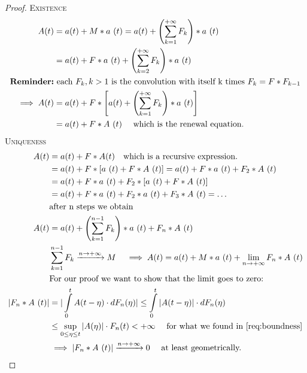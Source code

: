 \begin{proof}
	\proofpart
	\textsc{Existence}
		\begin{equation}\begin{split}
			A(t) &= a(t) + M \ast a~(t) = a(t) + \left(\sum\limits_{k=1}^{+\infty} F_k \right) \ast a~(t) \\
			&= a(t) + F \ast a~(t) +\left(\sum\limits_{k=2}^{+\infty} F_k \right) \ast a~(t)\\
			\text{\textbf{Reminder:}}&\text{ each $F_k , k>1$ is the convolution with itself k times $F_k = F \ast F_{k-1}$} \\
			\implies A(t) &= a(t) + F \ast \left[ a(t) + \left(\sum\limits_{k=1}^{+\infty} F_k \right) \ast a~(t) \right] \\
			&=a(t) + F \ast A ~ (t) \quad \text{ which is the renewal equation.}
		\end{split}\end{equation}
	\proofpart
	\textsc{Uniqueness}
	\begin{equation}\begin{split}
		A(t) &= a(t) + F \ast A(t) \quad \text{which is a recursive expression.} \\
		&= a(t) + F \ast \left[a~(t) + F \ast A~(t) \right] = a(t) + F \ast a ~ (t) + F_2 \ast A~(t) \\
		&= a(t) + F \ast a ~ (t) + F_2 \ast \left[a~(t) + F \ast A~(t) \right] \\
		&= a(t) + F \ast a~(t) + F_2 \ast a~(t) + F_3 \ast A~(t) = \dots \\
		&\text{after n steps we obtain} \\
		A(t) &= a(t) + \left( \sum\limits_{k=1}^{n-1}F_k\right) \ast a~(t) + F_n \ast A~(t) \\
		& \sum\limits_{k=1}^{n-1}F_k \xrightarrow{n \to +\infty} M \quad \implies A(t) = a(t) + M \ast a~(t) + \lim_{n \to +\infty} F_n \ast A~(t) \\
		&\text{For our proof we want to show that the limit goes to zero:} \\
		|F_n \ast A~(t)| &= |\int\limits_0^{t}A(t-\eta) \cdot dF_n(\eta)| \le \int\limits_0^{t}|A(t-\eta)| \cdot dF_n(\eta) \\
		& \le \sup\limits_{0 \le \eta \le t} |A(\eta)| \cdot F_n (t) < +\infty \quad \text{ for what we found in \ref{req:boundness}} \\
		&\implies |F_n \ast A~(t)| \xrightarrow{n \to +\infty} 0 \quad\text{ at least geometrically.}
	\end{split}\end{equation}
\end{proof}

